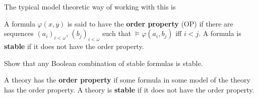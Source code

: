 \documentclass{article}
\let\models\vDash
\begin{document}
The typical model theoretic way of working with this is
\begin{defi}
  A formula $\varphi(x,y)$ is said to have the \textbf{order property} (OP) if there are sequences $(a_i)_{i < \omega}$, $(b_j)_{i < \omega}$ such that $\models \varphi(a_i,b_j)$ iff $i < j$.
  A formula is \textbf{stable} if it does not have the order property.
\end{defi}
\begin{ex}
  Show that any Boolean combination of stable formulas is stable.
\end{ex}
\begin{defi}
  A theory has the \textbf{order property} if some formula in some model of the theory has the order property.
  A theory is \textbf{stable} if it does not have the order property.
\end{defi}
\end{document}
